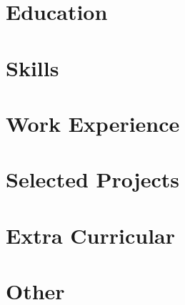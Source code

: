 \documentclass[a4paper,12pt]{article}
\begin{document}
\pagestyle{empty} 


\vspace{12pt}

\section{Education}

\vspace{12pt}

\section{Skills}

\vspace{12pt}

\section{Work Experience}



\vspace{12pt}

\section{Selected Projects}




\vspace{12pt}

\section{Extra Curricular}

\vspace{12pt}

\section{Other}

\vspace{12pt}
\end{document}
